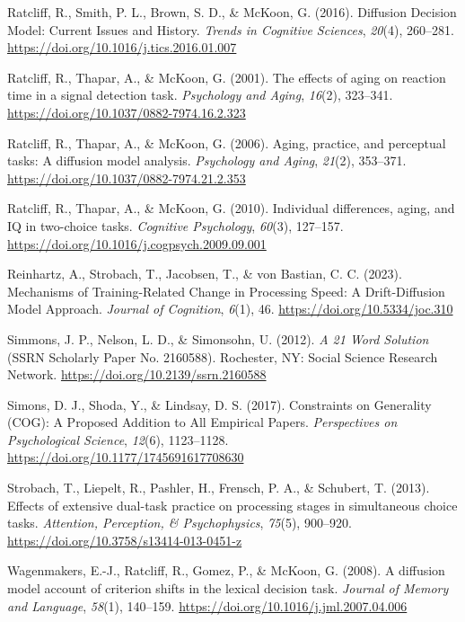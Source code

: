 \documentclass[
  english,
  man, donotrepeattitle,floatsintext]{apa6}
\newlength{\cslhangindent}
\newenvironment{CSLReferences}[2] %
 {\begin{list}{}{%
  \setlength{\itemindent}{0pt}
  \setlength{\leftmargin}{0pt}
  \setlength{\parsep}{0pt}
  \ifodd #1
   \setlength{\leftmargin}{\cslhangindent}
   \setlength{\itemindent}{-1\cslhangindent}
  \fi
  \setlength{\itemsep}{#2\baselineskip}}}
 {\end{list}}
\begin{document}
\begin{CSLReferences}{1}{0}
Ratcliff, R., Smith, P. L., Brown, S. D., \& McKoon, G. (2016). Diffusion {Decision Model}: {Current Issues} and {History}. \emph{Trends in Cognitive Sciences}, \emph{20}(4), 260--281. \url{https://doi.org/10.1016/j.tics.2016.01.007}

Ratcliff, R., Thapar, A., \& McKoon, G. (2001). The effects of aging on reaction time in a signal detection task. \emph{Psychology and Aging}, \emph{16}(2), 323--341. \url{https://doi.org/10.1037/0882-7974.16.2.323}

Ratcliff, R., Thapar, A., \& McKoon, G. (2006). Aging, practice, and perceptual tasks: {A} diffusion model analysis. \emph{Psychology and Aging}, \emph{21}(2), 353--371. \url{https://doi.org/10.1037/0882-7974.21.2.353}

Ratcliff, R., Thapar, A., \& McKoon, G. (2010). Individual differences, aging, and {IQ} in two-choice tasks. \emph{Cognitive Psychology}, \emph{60}(3), 127--157. \url{https://doi.org/10.1016/j.cogpsych.2009.09.001}

Reinhartz, A., Strobach, T., Jacobsen, T., \& von Bastian, C. C. (2023). Mechanisms of {Training-Related Change} in {Processing Speed}: {A Drift-Diffusion Model Approach}. \emph{Journal of Cognition}, \emph{6}(1), 46. \url{https://doi.org/10.5334/joc.310}

Simmons, J. P., Nelson, L. D., \& Simonsohn, U. (2012). \emph{A 21 {Word Solution}} (SSRN Scholarly Paper No. 2160588). Rochester, NY: Social Science Research Network. \url{https://doi.org/10.2139/ssrn.2160588}

Simons, D. J., Shoda, Y., \& Lindsay, D. S. (2017). Constraints on {Generality} ({COG}): {A Proposed Addition} to {All Empirical Papers}. \emph{Perspectives on Psychological Science}, \emph{12}(6), 1123--1128. \url{https://doi.org/10.1177/1745691617708630}

Strobach, T., Liepelt, R., Pashler, H., Frensch, P. A., \& Schubert, T. (2013). Effects of extensive dual-task practice on processing stages in simultaneous choice tasks. \emph{Attention, Perception, \& Psychophysics}, \emph{75}(5), 900--920. \url{https://doi.org/10.3758/s13414-013-0451-z}

Wagenmakers, E.-J., Ratcliff, R., Gomez, P., \& McKoon, G. (2008). A diffusion model account of criterion shifts in the lexical decision task. \emph{Journal of Memory and Language}, \emph{58}(1), 140--159. \url{https://doi.org/10.1016/j.jml.2007.04.006}


\end{CSLReferences}
\end{document}
